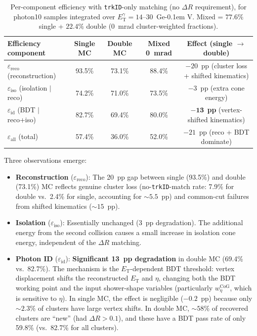 \documentclass[11pt,a4paper]{article}
\newcommand{\ET}{\ensuremath{E_{\text{T}}}\xspace}
\newcommand{\etg}{\ensuremath{E_{\mathrm{T}}^{\gamma}}\xspace}
\newcommand{\DR}{\ensuremath{\Delta R}\xspace}
\newcommand{\GeV}{\ifmmode {\mathrm{\ Ge\kern -0.1em V}}\else\textrm{Ge\kern -0.1em V}\fi\xspace}
\begin{document}
\begin{table}[H]
    \centering
    \caption{Per-component efficiency with \texttt{trkID}-only matching (no \DR
      requirement), for photon10 samples integrated over $\etg = 14$--$30$~\GeV.
      Mixed = $77.6\%$ single + $22.4\%$ double (0~mrad cluster-weighted fractions).}
    \label{tab:eff_breakdown}
    \begin{tabular}{lcccc}
        \toprule
        Efficiency component & Single MC & Double MC & Mixed 0~mrad & Effect (single $\to$ double) \\
        \midrule
        $\varepsilon_{\text{reco}}$ (reconstruction)
          & 93.5\% & 73.1\% & 88.4\% & $-20$~pp (cluster loss + shifted kinematics) \\
        $\varepsilon_{\text{iso}}$ (isolation $|$ reco)
          & 74.2\% & 71.0\% & 73.5\% & $-3$~pp (extra cone energy) \\
        $\varepsilon_{\text{id}}$ (BDT $|$ reco+iso)
          & 82.7\% & 69.4\% & 80.0\% & $\mathbf{-13}$~\textbf{pp} (vertex-shifted kinematics) \\
        \midrule
        $\varepsilon_{\text{all}}$ (total)
          & 57.4\% & 36.0\% & 52.0\% & $-21$~pp (reco + BDT dominate) \\
        \bottomrule
    \end{tabular}
\end{table}

Three observations emerge:

\begin{itemize}
    \item \textbf{Reconstruction} ($\varepsilon_{\text{reco}}$): The 20~pp gap
      between single (93.5\%) and double (73.1\%) MC reflects genuine cluster loss
      (no-\texttt{trkID}-match rate: 7.9\% for double vs.\ 2.4\% for single,
      accounting for ${\sim}5.5$~pp) and common-cut failures from shifted
      kinematics (${\sim}15$~pp).

    \item \textbf{Isolation} ($\varepsilon_{\text{iso}}$): Essentially unchanged
      (3~pp degradation). The additional energy from the second collision causes
      a small increase in isolation cone energy, independent of the \DR matching.

    \item \textbf{Photon ID} ($\varepsilon_{\text{id}}$): \textbf{Significant
      13~pp degradation} in double MC (69.4\% vs.\ 82.7\%).
      The mechanism is the \ET-dependent BDT threshold: vertex displacement shifts
      the reconstructed \ET and $\eta$, changing both the BDT working point and the
      input shower-shape variables (particularly $w_\eta^{\text{CoG}}$, which is
      sensitive to $\eta$).
      In single MC, the effect is negligible ($-0.2$~pp) because only
      ${\sim}2.3\%$ of clusters have large vertex shifts.
      In double MC, ${\sim}58\%$ of recovered clusters are ``new'' (had
      $\DR > 0.1$), and these have a BDT pass rate of only 59.8\% (vs.\ 82.7\%
      for all clusters).
\end{itemize}
\end{document}
